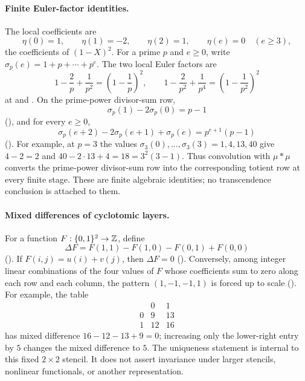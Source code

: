 \documentclass[11pt]{article}
\begin{document}
\paragraph{Finite Euler-factor identities.}
The local coefficients are
\[
  \eta(0)=1,\qquad \eta(1)=-2,\qquad \eta(2)=1,\qquad
  \eta(e)=0\quad(e\ge3),
\]
the coefficients of $(1-X)^2$.  For a prime $p$ and $e\ge0$, write
$\sigma_p(e)=1+p+\cdots+p^e$.  The two local Euler factors are
\[
  1-\frac2p+\frac1{p^2}=\left(1-\frac1p\right)^2,
  \qquad
  1-\frac2{p^2}+\frac1{p^4}
      =\left(1-\frac1{p^2}\right)^2
\]
at
and
.
On the prime-power divisor-sum row,
\[
  \sigma_p(1)-2\sigma_p(0)=p-1
\]
(),
and for every $e\ge0$,
\[
  \sigma_p(e+2)-2\sigma_p(e+1)+\sigma_p(e)
    =p^{e+1}(p-1)
\]
().
For example, at $p=3$ the values
$\sigma_3(0),\ldots,\sigma_3(3)=1,4,13,40$ give
$4-2=2$ and $40-2\cdot13+4=18=3^2(3-1)$.  Thus convolution with
$\mu\ast\mu$ converts the prime-power divisor-sum row into the corresponding
totient row at every finite stage.  These are finite algebraic identities; no
transcendence conclusion is attached to them.

\paragraph{Mixed differences of cyclotomic layers.}
For a function $F:\{0,1\}^2\to\mathbb{Z}$, define
\[
  \Delta F=F(1,1)-F(1,0)-F(0,1)+F(0,0)
\]
().
If $F(i,j)=u(i)+v(j)$, then $\Delta F=0$
().
Conversely, among integer linear combinations of the four values of $F$ whose
coefficients sum to zero along each row and each column, the pattern
$(1,-1,-1,1)$ is forced up to scale
().
For example, the table
\[
\begin{array}{c|cc}
 &0&1\\ \hline
0&9&13\\
1&12&16
\end{array}
\]
has mixed difference $16-12-13+9=0$; increasing only the lower-right entry by
$5$ changes the mixed difference to $5$.  The uniqueness statement is
internal to this fixed $2\times2$ stencil.  It does not assert invariance under
larger stencils, nonlinear functionals, or another representation.
\end{document}

